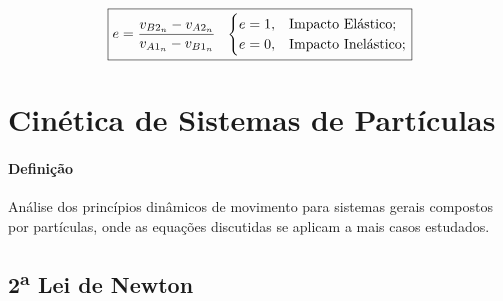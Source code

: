 \documentclass{article}
\begin{document}
\begin{enumerate}[noitemsep]
                        \begin{equation}
                            \boxed{
                                e = \frac{v_{B2_{n}} - v_{A2_{n}}}{v_{A1_{n}} - v_{B1_{n}}}
                                \hspace{2.5mm}
                                \begin{cases}
                                    e = 1, & \text{Impacto Elástico};\\
                                    e = 0, & \text{Impacto Inelástico};\\
                                \end{cases}
                            }
                        \end{equation}
                \end{enumerate}
\newpage

    \section{Cinética de Sistemas de Partículas}
        \paragraph{Definição}Análise dos princípios dinâmicos de movimento para sistemas gerais compostos por partículas, onde as equações discutidas se aplicam a mais casos estudados.

        \subsection{2\textsuperscript{a} Lei de Newton}
\end{document}
